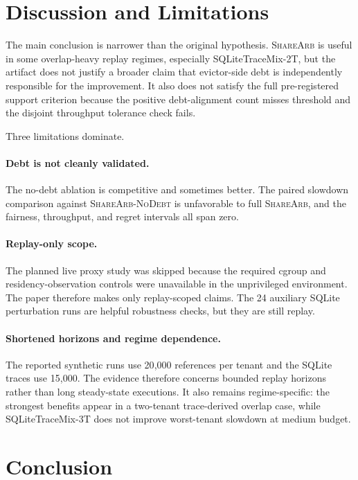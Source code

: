 \documentclass{article}
\newcommand{\sharearb}{\textsc{ShareArb}\xspace}
\begin{document}
\section{Discussion and Limitations}
\label{sec:discussion}

The main conclusion is narrower than the original hypothesis. \sharearb is useful in some overlap-heavy replay regimes, especially SQLiteTraceMix-2T, but the artifact does not justify a broader claim that evictor-side debt is independently responsible for the improvement. It also does not satisfy the full pre-registered support criterion because the positive debt-alignment count misses threshold and the disjoint throughput tolerance check fails.

Three limitations dominate.

\paragraph{Debt is not cleanly validated.}
The no-debt ablation is competitive and sometimes better. The paired slowdown comparison against \textsc{ShareArb-NoDebt} is unfavorable to full \sharearb, and the fairness, throughput, and regret intervals all span zero.

\paragraph{Replay-only scope.}
The planned live proxy study was skipped because the required cgroup and residency-observation controls were unavailable in the unprivileged environment. The paper therefore makes only replay-scoped claims. The 24 auxiliary SQLite perturbation runs are helpful robustness checks, but they are still replay.

\paragraph{Shortened horizons and regime dependence.}
The reported synthetic runs use 20{,}000 references per tenant and the SQLite traces use 15{,}000. The evidence therefore concerns bounded replay horizons rather than long steady-state executions. It also remains regime-specific: the strongest benefits appear in a two-tenant trace-derived overlap case, while SQLiteTraceMix-3T does not improve worst-tenant slowdown at medium budget.

\section{Conclusion}
\label{sec:conclusion}
\end{document}
